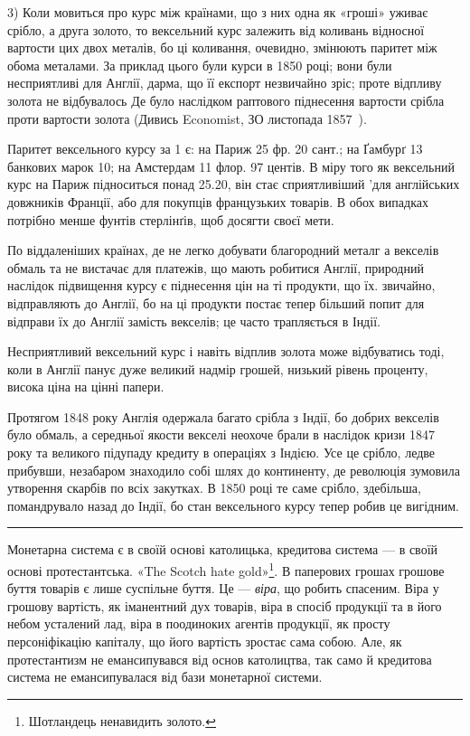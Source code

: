 
3) Коли мовиться про курс між країнами, що з них одна як «гроші»
уживає срібло, а друга золото, то вексельний курс залежить від коливань відносної
вартости цих двох металів, бо ці коливання, очевидно, змінюють паритет
між обома металами. За приклад цього були курси в 1850 році; вони були
несприятливі для Англії, дарма, що її експорт незвичайно зріс; проте відпливу
золота не відбувалось Де було наслідком раптового піднесення вартости срібла
проти вартости золота (Дивись Economist, ЗО листопада 1857~).

Паритет вексельного курсу за 1 є: на Париж 25 фр. 20 сант.; на
Ґамбурґ 13 банкових марок 10; на Амстердам 11 флор. 97 центів.
В міру того як вексельний курс на Париж підноситься понад 25.20, він стає
сприятливіший 'для англійських довжників Франції, або для покупців французьких
товарів. В обох випадках потрібно менше фунтів стерлінґів, щоб досягти
своєї мети.

По віддаленіших країнах, де не легко добувати благородний металг
а векселів обмаль та не вистачає для платежів, що мають робитися Англії,
природний наслідок підвищення курсу є піднесення цін на ті продукти, що їх.
звичайно, відправляють до Англії, бо на ці продукти постає тепер більший попит
для відправи їх до Англії замість векселів; це часто трапляється в Індії.

Несприятливий вексельний курс і навіть відплив золота може відбуватись
тоді, коли в Англії панує дуже великий надмір грошей, низький рівень проценту,
висока ціна на цінні папери.

Протягом 1848 року Англія одержала багато срібла з Індії, бо добрих
векселів було обмаль, а середньої якости векселі неохоче брали в наслідок
кризи 1847 року та великого підупаду кредиту в операціях з Індією. Усе це
срібло, ледве прибувши, незабаром знаходило собі шлях до континенту, де революція
зумовила утворення скарбів по всіх закутках. В 1850 році те саме
срібло, здебільша, помандрувало назад до Індії, бо стан вексельного курсу тепер
робив це вигідним.

\pfbreak

Монетарна система є в своїй основі католицька, кредитова система — в своїй
основі протестантська. «The Scotch hate gold»\footnote*{
Шотландець ненавидить золото. 
}. В паперових грошах грошове
буття товарів є лише суспільне буття. Це — \emph{віра}, що робить спасеним. Віра
у грошову вартість, як іманентний дух товарів, віра в спосіб продукції та в його
небом усталений лад, віра в поодиноких агентів продукції, як просту персоніфікацію
капіталу, що його вартість зростає сама собою. Але, як протестантизм
не емансипувався від основ католицтва, так само й кредитова система не емансипувалася
від бази монетарної системи.

